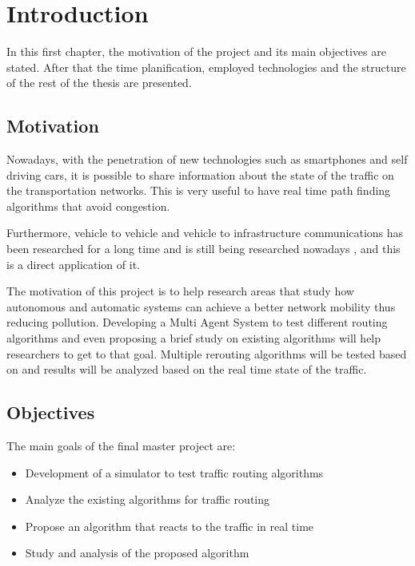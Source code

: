 \chapter{Introduction}

In this first chapter, the motivation of the project and its main objectives are stated. After that the time planification, employed technologies and the structure of the rest of the thesis are presented.

\section{Motivation}

Nowadays, with the penetration of new technologies such as smartphones and self driving cars, it is possible to share information about the state of the traffic on the transportation networks. This is very useful to have real time path finding algorithms that avoid congestion.

Furthermore, vehicle to vehicle and vehicle to infrastructure communications has been researched for a long time \cite{yang_liu_zhao_vaidya} and is still being researched nowadays \cite{tuohy_glavin_hughes_jones_trivedi_kilmartin_2015}, and this is a direct application of it.

The motivation of this project is to help research areas that study how autonomous and automatic systems can achieve a better network mobility thus reducing pollution. Developing a Multi Agent System to test different routing algorithms and even proposing a brief study on existing algorithms will help researchers to get to that goal. Multiple rerouting algorithms will be tested based on 
\cite{nisan_2007} and results will be analyzed based on the real time state of the traffic.

\section{Objectives}

The main goals of the final master project are:

\begin{itemize}
\item Development of a simulator to test traffic routing algorithms
\item Analyze the existing algorithms for traffic routing
\item Propose an algorithm that reacts to the traffic in real time
\item Study and analysis of the proposed algorithm
\end{itemize}

